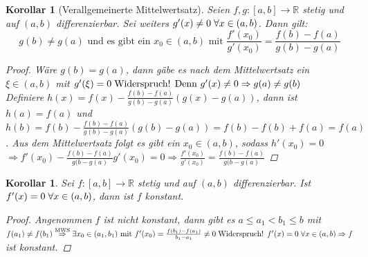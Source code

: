 \documentclass[a4paper,titlepage,oneside]{article}
\def\R{\ensuremath{\mathbb{R}} }
\def\WSP{\text{Widerspruch! }}
\def\sp{\hspace{0,1cm}}
\theoremstyle{thmstyle}
\newtheorem{korr}[satz]{Korollar}
\theoremstyle{subthmstyle}
\begin{document}
\begin{korr}[Verallgemeinerte Mittelwertsatz]
Seien $f,g:[a,b] \to \R$ stetig und auf $(a,b)$ differenzierbar. Sei weiters $g'(x) \ne 0 \sp \forall x \in (a,b)$. Dann gilt:
\[g(b) \ne g(a) \text{ und es gibt ein } x_0 \in (a,b) \text{ mit } \frac{f'(x_0)}{g'(x_0)} = \frac{f(b) - f(a)}{g(b) - g(a)}\]
\begin{proof}
Wäre $g(b) = g(a)$, dann gäbe es nach dem Mittelwertsatz ein $\xi \in (a,b)$ mit $g'(\xi) = 0 \sp \WSP \\
\text{Denn } g'(x) \ne 0 \Rightarrow g(a) \ne g(b)$\\
Definiere $ \displaystyle h(x)  = f(x) - \frac{f(b) - f(a)}{g(b) - g(a)}(g(x) - g(a))$, dann ist $h(a) = f(a)$ und $h(b) = f(b) - \frac{f(b) - f(a)}{g(b) - g(a)}(g(b) - g(a)) = f(b) - f(b) + f(a) = f(a)$. Aus dem Mittelwertsatz folgt es gibt ein $x_0 \in (a,b) $, sodass $h'(x_0) = 0 $  \\
$ \displaystyle \Rightarrow  f'(x_0) - \frac{f(b) - f(a)}{g(b - g(a)}g'(x_0) = 0 \Rightarrow \frac{f'(x_0)}{g'(x_0)} = \frac{f(b) - f(a)}{g(b - g(a)}$
\end{proof}
\end{korr}

\begin{korr}
Sei $f : [a,b] \to \R $ stetig und auf $(a,b)$ differenzierbar. Ist $f'(x) = 0 \sp \forall x \in (a,b)$, dann ist $f$ konstant.
\begin{proof}
Angenommen $f$ ist nicht konstant, dann gibt es $ \displaystyle a \le a_1 < b_1 \le b$ mit $f(a_1) \ne f(b_1) \overset{\text{MWS}}{\Rightarrow} \exists x_0 \in (a_1, b_1) \text{ mit } f'(x_0) = \frac{f(b_1) - f(a_1)}{b_1 - a_1} \ne 0 \sp \WSP f'(x) = 0 \sp \forall x \in (a,b) \Rightarrow f$ ist konstant.
\end{proof}
\end{korr}
\end{document}
